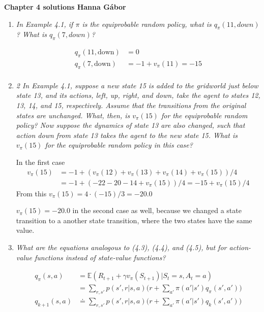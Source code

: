 \documentclass[12pt,a4paper]{article}
\begin{document}
\textbf{Chapter 4 solutions  \hfill Hanna Gábor}

\begin{enumerate}
  \item
    \textit{In Example 4.1, if $\pi$ is the equiprobable random policy, what is $q_\pi(11, down)$?
    What is $q_\pi(7, down)$?}

    \begin{align*}
    q_\pi(11, \text{down}) &= 0\\
    q_\pi(7, \text{down}) &= -1 + v_\pi(11) = -15\\
    \end{align*}

  \item
    \textit{2 In Example 4.1, suppose a new state 15 is added to the gridworld just below
    state 13, and its actions, left, up, right, and down, take the agent to states 12, 13, 14,
    and 15, respectively. Assume that the transitions from the original states are unchanged.
    What, then, is $v_\pi(15)$ for the equiprobable random policy? Now suppose the dynamics of
    state 13 are also changed, such that action down from state 13 takes the agent to the new
    state 15. What is $v_\pi(15)$ for the equiprobable random policy in this case?}

    In the first case
    \begin{align*}
      v_\pi(15) &= -1 + (v_\pi(12) + v_\pi(13) + v_\pi(14) + v_\pi(15))/4\\
      &=-1 + (- 22 - 20 - 14 + v_\pi(15))/4 = -15 + v_\pi(15)/4
    \end{align*}
    From this $v_\pi(15) = 4 \cdot (-15) /3 = - 20.0$

    $v_\pi(15) = - 20.0$ in the second case as well, because we changed a state
    transition to a another state transition, where the two states have the same value.

  \item
    \textit{What are the equations analogous to (4.3), (4.4), and (4.5), but for action-value
    functions instead of state-value functions?}

    \begin{align*}
      q_\pi(s, a) &= \mathbb{E}(R_{t + 1} + \gamma v_\pi (S_{t + 1})|S_t = s, A_t = a )\\
      &= \sum\limits_{r, s'} p(s', r | s, a) \Big(r + \sum\limits_{a'} \pi(a'|s') q_\pi(s', a')\Big)\\
      q_{k + 1}(s, a) &\doteq \sum\limits_{r, s'} p(s', r | s, a) \Big(r + \sum\limits_{a'} \pi(a'|s') q_k(s', a')\Big)
    \end{align*}


\end{enumerate}
\end{document}
